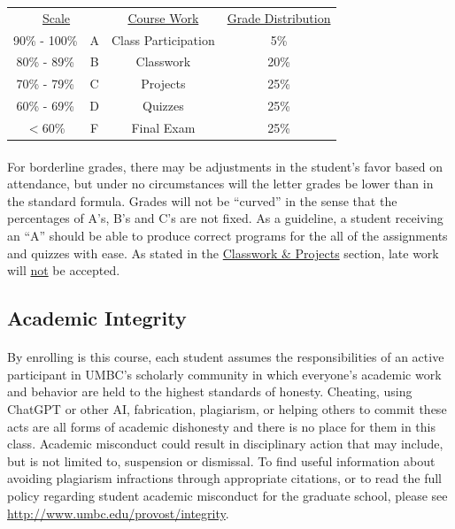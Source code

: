 \documentclass[letter,10pt]{article}
\begin{document}
\begin{center}
\begin{tabular}{ c c || c c}
\multicolumn{2}{c||}{\underline{Scale}} & \underline{Course Work} & \underline{Grade Distribution} \\
90\% - 100\% & A & Class Participation & 5\% \\
80\% - 89\%  & B & Classwork & 20\% \\
70\% - 79\%  & C & Projects & 25\% \\
60\% - 69\%  & D & Quizzes & 25\% \\
$<$60\%      & F & Final Exam & 25\% 
\end{tabular}
\end{center}

\paragraph{}For borderline grades, there may be adjustments in the student's favor based on attendance, but under no circumstances will the letter grades be lower than in the standard formula. Grades will not be ``curved'' in the sense that the percentages of A's, B's and C's are not fixed. As a guideline, a student receiving an ``A'' should be able to produce correct programs for the all of the assignments and quizzes with ease. As stated in the \hyperlink{sec:cwhw}{Classwork \& Projects} section, late work will \underline{not} be accepted.

\subsection*{Academic Integrity}
\paragraph{}By enrolling is this course, each student assumes the responsibilities of an active participant in UMBC's scholarly community in which everyone's academic work and behavior are held to the highest standards of honesty. Cheating, using ChatGPT or other AI, fabrication, plagiarism, or helping others to commit these acts are all forms of academic dishonesty and there is no place for them in this class. Academic misconduct could result in disciplinary action that may include, but is not limited to, suspension or dismissal. To find useful information about avoiding plagiarism infractions through appropriate citations, or to read the full policy regarding student academic misconduct for the graduate school, please see \url{http://www.umbc.edu/provost/integrity}.
\end{document}
